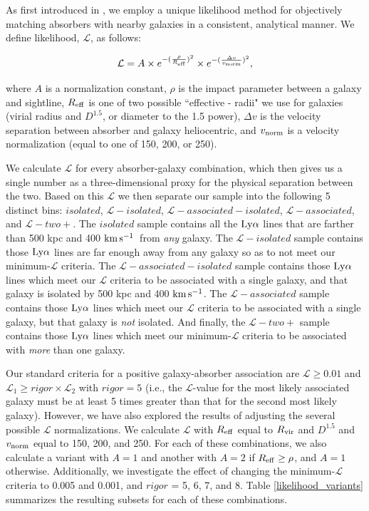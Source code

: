 \documentclass[twocolumn,tighten]{aastex62}
\newcommand{\kms}{$\rm km\, s^{-1}$}
\begin{document}
As first introduced in \cite{french2017}, we employ a unique likelihood method for objectively matching absorbers with nearby galaxies in a consistent, analytical manner. We define likelihood, $\mathcal{L}$, as follows: 

\begin{equation}
\mathcal{L} = A \times e^{-(\frac{\rho}{R_{\rm eff}})^2} \times e^{-(\frac{\Delta v}{v_{\rm norm}})^2},
\label{likelihood}
\end{equation}

\noindent where $A$ is a normalization constant, $\rho$ is the impact parameter between a galaxy and sightline, $R_{\rm eff}$ is one of two possible ``effective - radii" we use for galaxies (virial radius and $D^{1.5}$, or diameter to the 1.5 power), $\Delta v$ is the velocity separation between absorber and galaxy heliocentric, and $v_{\rm norm}$ is a velocity normalization (equal to one of 150, 200, or 250). 

We calculate $\mathcal{L}$ for every absorber-galaxy combination, which then gives us a single number as a three-dimensional proxy for the physical separation between the two. Based on this $\mathcal{L}$ we then separate our sample into the following 5 distinct bins: $isolated$, $\mathcal{L}-isolated$, $\mathcal{L}-associated-isolated$, $\mathcal{L}-associated$, and $\mathcal{L}-two+$. The $isolated$ sample contains all the $\rm Ly\alpha$ lines that are farther than 500 kpc and 400 \kms~from \emph{any} galaxy. The $\mathcal{L}-isolated$ sample contains those $\rm Ly\alpha$ lines are far enough away from any galaxy so as to not meet our minimum-$\mathcal{L}$ criteria. The $\mathcal{L}-associated-isolated$ sample contains those $\rm Ly\alpha$ lines which meet our $\mathcal{L}$ criteria to be associated with a single galaxy, and that galaxy is isolated by 500 kpc and 400 \kms. The $\mathcal{L}-associated$ sample contains those $\rm Ly\alpha$ lines which meet our $\mathcal{L}$ criteria to be associated with a single galaxy, but that galaxy is \emph{not} isolated. And finally, the $\mathcal{L}-two+$ sample contains those  $\rm Ly\alpha$ lines which meet our minimum-$\mathcal{L}$ criteria to be associated with \emph{more} than one galaxy.

Our standard criteria for a positive galaxy-absorber association are $\mathcal{L} \geq 0.01$ and $\mathcal{L}_1 \geq rigor \times \mathcal{L}_2$ with $rigor =5$ (i.e., the $\mathcal{L}$-value for the most likely associated galaxy must be at least 5 times greater than that for the second most likely galaxy). However, we have also explored the results of adjusting the several possible $\mathcal{L}$ normalizations. We calculate $\mathcal{L}$ with $R_{\rm eff}$ equal to $R_{\rm vir}$ and $D^{1.5}$ and $v_{\rm norm}$ equal to 150, 200, and 250. For each of these combinations, we also calculate a variant with $A =1$ and another with $A = 2$ if $R_{\rm eff} \ge \rho$, and $A=1$ otherwise. Additionally, we investigate the effect of changing the minimum-$\mathcal{L}$ criteria to 0.005 and 0.001, and $rigor$ = 5, 6, 7, and 8. Table \ref{likelihood_variants} summarizes the resulting subsets for each of these combinations. 
\end{document}

